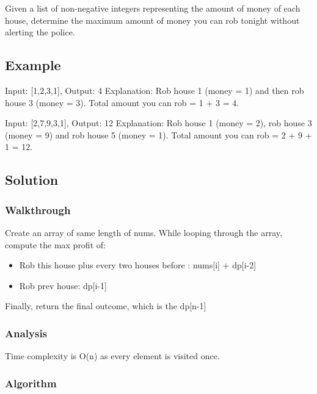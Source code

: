 \documentclass[]{book}
\begin{document}
Given a list of non-negative integers representing the amount of money of each house, determine the maximum amount of
money you can rob tonight without alerting the police.

\hypertarget{example-31}{%
\subsection{Example}\label{example-31}}

Input: {[}1,2,3,1{]}, Output: 4
Explanation: Rob house 1 (money = 1) and then rob house 3 (money = 3).
Total amount you can rob = 1 + 3 = 4.

Input: {[}2,7,9,3,1{]}, Output: 12
Explanation: Rob house 1 (money = 2), rob house 3 (money = 9) and rob house 5 (money = 1).
Total amount you can rob = 2 + 9 + 1 = 12.

\hypertarget{solution-25}{%
\subsection{Solution}\label{solution-25}}

\hypertarget{walkthrough-31}{%
\subsubsection{Walkthrough}\label{walkthrough-31}}

Create an array of same length of nums. While looping through the array, compute the max profit of:

\begin{itemize}
    \item Rob this house plus every two houses before : nums[i] + dp[i-2]
    \item Rob prev house: dp[i-1]
\end{itemize}

Finally, return the final outcome, which is the dp{[}n-1{]}

\hypertarget{analysis-34}{%
\subsubsection{Analysis}\label{analysis-34}}

Time complexity is O(n) as every element is visited once.

\hypertarget{algorithm-34}{%
\subsubsection{Algorithm}\label{algorithm-34}}
\end{document}
